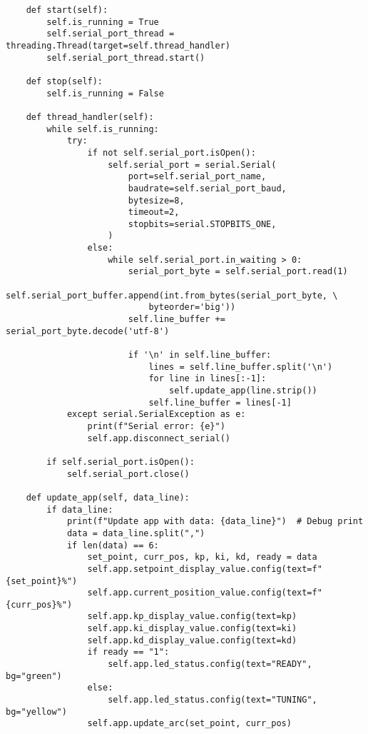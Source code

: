 \documentclass{article}
\begin{document}
\begin{verbatim}
    def start(self):
        self.is_running = True
        self.serial_port_thread = threading.Thread(target=self.thread_handler)
        self.serial_port_thread.start()

    def stop(self):
        self.is_running = False

    def thread_handler(self):
        while self.is_running:
            try:
                if not self.serial_port.isOpen():
                    self.serial_port = serial.Serial(
                        port=self.serial_port_name,
                        baudrate=self.serial_port_baud,
                        bytesize=8,
                        timeout=2,
                        stopbits=serial.STOPBITS_ONE,
                    )
                else:
                    while self.serial_port.in_waiting > 0:
                        serial_port_byte = self.serial_port.read(1)
                        self.serial_port_buffer.append(int.from_bytes(serial_port_byte, \ 
                            byteorder='big'))
                        self.line_buffer += serial_port_byte.decode('utf-8')

                        if '\n' in self.line_buffer:
                            lines = self.line_buffer.split('\n')
                            for line in lines[:-1]:
                                self.update_app(line.strip())
                            self.line_buffer = lines[-1]
            except serial.SerialException as e:
                print(f"Serial error: {e}")
                self.app.disconnect_serial()

        if self.serial_port.isOpen():
            self.serial_port.close()

    def update_app(self, data_line):
        if data_line:
            print(f"Update app with data: {data_line}")  # Debug print
            data = data_line.split(",")
            if len(data) == 6:
                set_point, curr_pos, kp, ki, kd, ready = data
                self.app.setpoint_display_value.config(text=f"{set_point}%")
                self.app.current_position_value.config(text=f"{curr_pos}%")
                self.app.kp_display_value.config(text=kp)
                self.app.ki_display_value.config(text=ki)
                self.app.kd_display_value.config(text=kd)
                if ready == "1":
                    self.app.led_status.config(text="READY", bg="green")
                else:
                    self.app.led_status.config(text="TUNING", bg="yellow")
                self.app.update_arc(set_point, curr_pos)


\end{verbatim}
\end{document}
